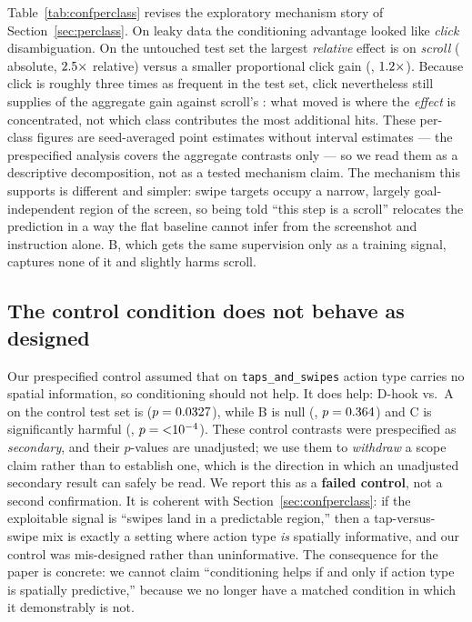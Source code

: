 Table~\ref{tab:confperclass} revises the exploratory mechanism story of
Section~\ref{sec:perclass}. On leaky data the conditioning advantage looked
like \emph{click} disambiguation. On the untouched test set the largest
\emph{relative} effect is on \emph{scroll} (\ConfScrollDelta{} absolute,
$2.5\times$ relative) versus a smaller proportional click gain
(\ConfClickDelta{}, $1.2\times$). Because click is roughly three
times as frequent in the test set, click nevertheless still supplies
\ConfClickAbsShare{} of the aggregate gain against scroll's
\ConfScrollAbsShare{}: what moved is where the \emph{effect} is
concentrated, not which class contributes the most additional hits. These
per-class figures are seed-averaged point estimates without interval
estimates --- the prespecified analysis covers the aggregate contrasts only
--- so we read them as a descriptive decomposition, not as a tested
mechanism claim. The
mechanism this supports is different and simpler: swipe targets occupy a
narrow, largely goal-independent region of the screen, so being told
``this step is a scroll'' relocates the prediction in a way the flat
baseline cannot infer from the screenshot and instruction alone. B, which
gets the same supervision only as a training signal, captures none of it
and slightly harms scroll.

\subsection{The control condition does not behave as designed}
\label{sec:controlfail}

Our prespecified control assumed that on \texttt{taps\_and\_swipes}
action type carries no spatial information, so conditioning should not
help. It does help: D-hook vs.\ A on the control test set is
\ConfCtrlDhvsA{} ($p=0.0327$), while B is null
(\ConfCtrlBvsA{}, $p=0.364$) and C is significantly harmful
(\ConfCtrlCvsA{}, $p={<}10^{-4}$). These control contrasts were
prespecified as \emph{secondary}, and their $p$-values are unadjusted; we
use them to \emph{withdraw} a scope claim rather than to establish one,
which is the direction in which an unadjusted secondary result can safely
be read. We report this as a \textbf{failed
control}, not a second confirmation. It is coherent with
Section~\ref{sec:confperclass}: if the exploitable signal is ``swipes land
in a predictable region,'' then a tap-versus-swipe mix is exactly a
setting where action type \emph{is} spatially informative, and our control
was mis-designed rather than uninformative. The consequence for the paper
is concrete: we cannot claim ``conditioning helps if and only if action
type is spatially predictive,'' because we no longer have a matched
condition in which it demonstrably is not.


